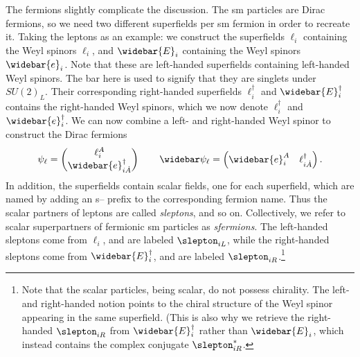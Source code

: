 The fermions slightly complicate the discussion. The \gls{sm} particles are Dirac fermions, so we need two different superfields per \gls{sm} fermion in order to recreate it. Taking the leptons as an example: we construct the superfields $\ell_i$ containing the Weyl spinors $\ell_i$, and $\widebar{E}_i$ containing the Weyl spinors $\widebar{e}_i$. Note that these are left-handed superfields containing left-handed Weyl spinors. The bar here is used to signify that they are singlets under $SU(2)_L$. Their corresponding right-handed superfields $\ell_i^\dagger$ and $\widebar{E}_i^\dagger$ contains the right-handed Weyl spinors, which we now denote $\ell_i^\dagger$ and $\widebar{e}_i^\dagger$.
We can now combine a left- and right-handed Weyl spinor to construct the Dirac fermions
\begin{equation}
    \psi_\ell = \begin{pmatrix}
        \ell_i^A \\ \widebar{e}^\dagger_{i\dot{A}}
    \end{pmatrix} \qquad
    \widebar\psi_\ell = \begin{pmatrix}
        \widebar{e}_i^A & \ell^\dagger_{i\dot{A}}
    \end{pmatrix}.
\end{equation}
In addition, the superfields contain scalar fields, one for each superfield, which are named by adding an s-- prefix to the corresponding fermion name. Thus the scalar partners of leptons are called \emph{sleptons}, and so on. Collectively, we refer to scalar superpartners of fermionic \gls{sm} particles as \emph{sfermions}.
The left-handed sleptons come from $\ell_i$, and are labeled $\slepton_{iL}$, while the right-handed sleptons come from $\widebar{E}_i^\dagger$, and are labeled $\slepton_{iR}$.\footnote{Note that the scalar particles, being scalar, do not possess chirality. The left- and right-handed notion points to the chiral structure of the Weyl spinor appearing in the same superfield. (This is also why we retrieve the right-handed $\slepton_{iR}$ from $\widebar{E}_i^\dagger$ rather than $\widebar{E}_i$, which instead contains the complex conjugate $\slepton_{iR}^*$.}

